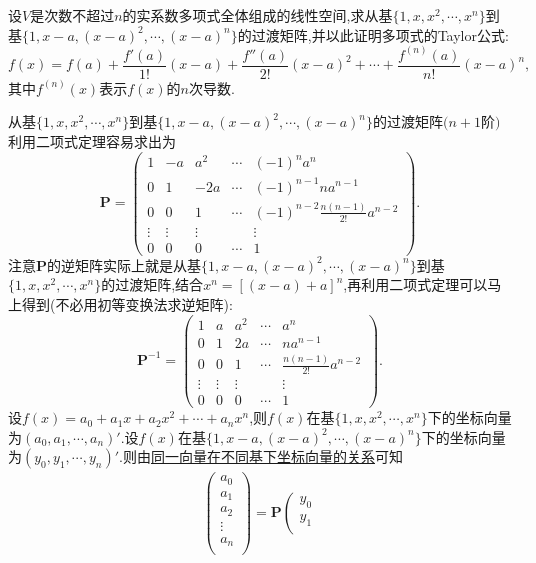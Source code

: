 \documentclass[../../main.tex]{subfiles}
\begin{document}
\begin{example}
设\(V\)是次数不超过\(n\)的实系数多项式全体组成的线性空间,求从基\(\{1,x,x^2,\cdots,x^n\}\)到基\(\{1,x - a,(x - a)^2,\cdots,(x - a)^n\}\)的过渡矩阵,并以此证明多项式的Taylor公式:
\[
f(x)=f(a)+\frac{f'(a)}{1!}(x - a)+\frac{f''(a)}{2!}(x - a)^2+\cdots+\frac{f^{(n)}(a)}{n!}(x - a)^n,
\]
其中\(f^{(n)}(x)\)表示\(f(x)\)的\(n\)次导数.
\end{example}
\begin{solution}
从基\(\{1,x,x^2,\cdots,x^n\}\)到基\(\{1,x - a,(x - a)^2,\cdots,(x - a)^n\}\)的过渡矩阵\((n + 1\)阶\()\)利用二项式定理容易求出为
\[
\boldsymbol{P}=\begin{pmatrix}
1&-a&a^2&\cdots&(-1)^na^n\\
0&1&-2a&\cdots&(-1)^{n - 1}na^{n - 1}\\
0&0&1&\cdots&(-1)^{n - 2}\frac{n(n - 1)}{2!}a^{n - 2}\\
\vdots&\vdots&\vdots&&\vdots\\
0&0&0&\cdots&1
\end{pmatrix}.
\]
注意\(\boldsymbol{P}\)的逆矩阵实际上就是从基\(\{1,x - a,(x - a)^2,\cdots,(x - a)^n\}\)到基\(\{1,x,x^2,\cdots,x^n\}\)的过渡矩阵,结合$x^n=[(x-a)+a]^n$,再利用二项式定理可以马上得到(不必用初等变换法求逆矩阵):
\[
\boldsymbol{P}^{-1}=\begin{pmatrix}
1&a&a^2&\cdots&a^n\\
0&1&2a&\cdots&na^{n - 1}\\
0&0&1&\cdots&\frac{n(n - 1)}{2!}a^{n - 2}\\
\vdots&\vdots&\vdots&&\vdots\\
0&0&0&\cdots&1
\end{pmatrix}.
\]
设\(f(x)=a_0 + a_1x + a_2x^2+\cdots + a_nx^n\),则\(f(x)\)在基\(\{1,x ,x^2,\cdots,x^n\}\)下的坐标向量为$(a_0,a_1,\cdots,a_n)'$.设\(f(x)\)在基\(\{1,x - a,(x - a)^2,\cdots,(x - a)^n\}\)下的坐标向量为$(y_0,y_1,\cdots,y_n)'$.则由\hyperref[theorem:同一向量在不同基下坐标向量的关系]{同一向量在不同基下坐标向量的关系}可知
\begin{align*}
\left( \begin{array}{c}
a_0\\
a_1\\
a_2\\
\vdots\\
a_n\\
\end{array} \right) =\boldsymbol{P}\left( \begin{array}{c}
y_0\\
y_1\\

\end{array}
\end{align*}
\end{solution}
\end{document}
